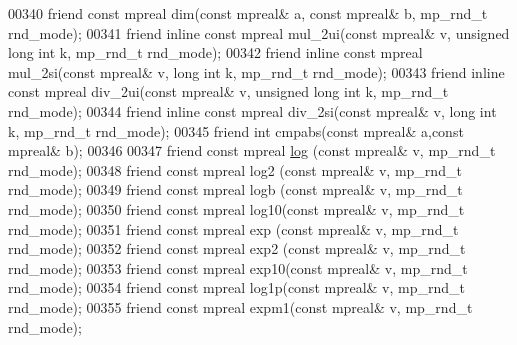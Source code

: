\begin{DoxyCode}
00340     \textcolor{keyword}{friend} \textcolor{keyword}{const} mpreal dim(\textcolor{keyword}{const} mpreal& a, \textcolor{keyword}{const} mpreal& b, mp\_rnd\_t rnd\_mode);
00341     \textcolor{keyword}{friend} \textcolor{keyword}{inline} \textcolor{keyword}{const} mpreal mul\_2ui(\textcolor{keyword}{const} mpreal& v, \textcolor{keywordtype}{unsigned} \textcolor{keywordtype}{long} \textcolor{keywordtype}{int} k, mp\_rnd\_t rnd\_mode);
00342     \textcolor{keyword}{friend} \textcolor{keyword}{inline} \textcolor{keyword}{const} mpreal mul\_2si(\textcolor{keyword}{const} mpreal& v, \textcolor{keywordtype}{long} \textcolor{keywordtype}{int} k, mp\_rnd\_t rnd\_mode);
00343     \textcolor{keyword}{friend} \textcolor{keyword}{inline} \textcolor{keyword}{const} mpreal div\_2ui(\textcolor{keyword}{const} mpreal& v, \textcolor{keywordtype}{unsigned} \textcolor{keywordtype}{long} \textcolor{keywordtype}{int} k, mp\_rnd\_t rnd\_mode);
00344     \textcolor{keyword}{friend} \textcolor{keyword}{inline} \textcolor{keyword}{const} mpreal div\_2si(\textcolor{keyword}{const} mpreal& v, \textcolor{keywordtype}{long} \textcolor{keywordtype}{int} k, mp\_rnd\_t rnd\_mode);
00345     \textcolor{keyword}{friend} \textcolor{keywordtype}{int} cmpabs(\textcolor{keyword}{const} mpreal& a,\textcolor{keyword}{const} mpreal& b);
00346 
00347     \textcolor{keyword}{friend} \textcolor{keyword}{const} mpreal \hyperlink{structlog}{log}  (\textcolor{keyword}{const} mpreal& v, mp\_rnd\_t rnd\_mode);
00348     \textcolor{keyword}{friend} \textcolor{keyword}{const} mpreal log2 (\textcolor{keyword}{const} mpreal& v, mp\_rnd\_t rnd\_mode);
00349     \textcolor{keyword}{friend} \textcolor{keyword}{const} mpreal logb (\textcolor{keyword}{const} mpreal& v, mp\_rnd\_t rnd\_mode);
00350     \textcolor{keyword}{friend} \textcolor{keyword}{const} mpreal log10(\textcolor{keyword}{const} mpreal& v, mp\_rnd\_t rnd\_mode);
00351     \textcolor{keyword}{friend} \textcolor{keyword}{const} mpreal exp  (\textcolor{keyword}{const} mpreal& v, mp\_rnd\_t rnd\_mode);
00352     \textcolor{keyword}{friend} \textcolor{keyword}{const} mpreal exp2 (\textcolor{keyword}{const} mpreal& v, mp\_rnd\_t rnd\_mode);
00353     \textcolor{keyword}{friend} \textcolor{keyword}{const} mpreal exp10(\textcolor{keyword}{const} mpreal& v, mp\_rnd\_t rnd\_mode);
00354     \textcolor{keyword}{friend} \textcolor{keyword}{const} mpreal log1p(\textcolor{keyword}{const} mpreal& v, mp\_rnd\_t rnd\_mode);
00355     \textcolor{keyword}{friend} \textcolor{keyword}{const} mpreal expm1(\textcolor{keyword}{const} mpreal& v, mp\_rnd\_t rnd\_mode);

\end{DoxyCode}
